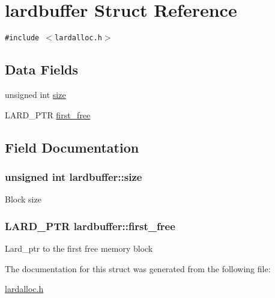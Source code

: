 \hypertarget{structlardbuffer}{
\section{lardbuffer Struct Reference}
\label{structlardbuffer}
}
{\tt \#include $<$lardalloc.h$>$}

\subsection*{Data Fields}
\begin{CompactItemize}
\item 
unsigned int \hyperlink{structlardbuffer_8ba0d4aef5921d79d1c0c81cfa5776cb}{size}
\item 
LARD\_\-PTR \hyperlink{structlardbuffer_d2bb723c71071742d806d4825e1138f3}{first\_\-free}
\end{CompactItemize}


\subsection{Field Documentation}
\hypertarget{structlardbuffer_8ba0d4aef5921d79d1c0c81cfa5776cb}{
\subsubsection{\setlength{\rightskip}{0pt plus 5cm}unsigned int {\bf lardbuffer::size}}}
\label{structlardbuffer_8ba0d4aef5921d79d1c0c81cfa5776cb}


Block size \hypertarget{structlardbuffer_d2bb723c71071742d806d4825e1138f3}{
\subsubsection{\setlength{\rightskip}{0pt plus 5cm}LARD\_\-PTR {\bf lardbuffer::first\_\-free}}}
\label{structlardbuffer_d2bb723c71071742d806d4825e1138f3}


Lard\_\-ptr to the first free memory block 

The documentation for this struct was generated from the following file:\begin{CompactItemize}
\item 
\hyperlink{lardalloc_8h}{lardalloc.h}\end{CompactItemize}
